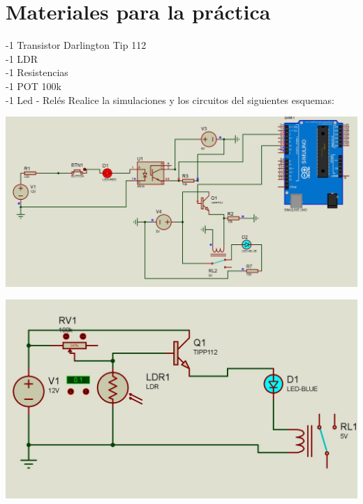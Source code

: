 \documentclass[12pt,a4paper]{article}
\begin{document}
\section{Materiales para la práctica}
\begin{flushleft}
-1 Transistor Darlington Tip 112\\
-1 LDR\\
-1 Resistencias \\
-1 POT 100k\\
-1 Led 
- Relés
Realice la simulaciones y los circuitos del siguientes esquemas:\\
\end{flushleft}
\begin{center}
\includegraphics[scale=0.2]{imagenes/circuito.JPG} \linebreak

\includegraphics[scale=0.4]{imagenes/circuito0.JPG} \linebreak
\end{center}
\newpage
\end{document}
